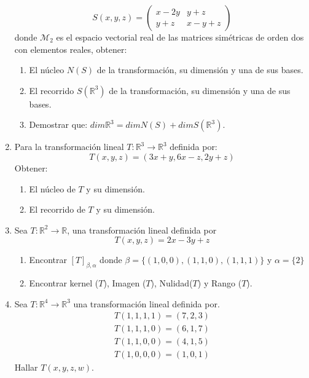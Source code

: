 \documentclass[12pt,letterpaper]{article}
\begin{document}
\begin{enumerate}
  $$
  S(x,y,z) = \begin{pmatrix}
    x-2y & y+z\\
    y+z & x-y+z
  \end{pmatrix}
  $$
  donde $\mathcal{M}_2$ es el espacio vectorial real de las matrices simétricas de orden dos con elementos reales, obtener:
  \begin{enumerate}
    \item El núcleo $N(S)$ de la transformación, su dimensión y una de sus bases.
    \item El recorrido $S(\mathbb{R}^3)$ de la transformación, su dimensión y una de sus bases.
    \item Demostrar que: $dim\mathbb{R}^3 = dim N(S) + dim S(\mathbb{R}^3)$.
  \end{enumerate}
  \item Para la transformación lineal $T : \mathbb{R}^3\to\mathbb{R}^3$ definida por:
  $$
  T (x, y, z) = (3x + y,6x- z,2y + z)
  $$
  Obtener:
  \begin{enumerate}
    \item El núcleo de $T$ y su dimensión.
    \item El recorrido de $T$ y su dimensión.
  \end{enumerate}
  \item Sea $T: \mathbb{R}^2\to\mathbb{R}$, una transformación lineal definida por
  $$
  T (x,y,z) = 2x -3y + z
  $$
  \begin{enumerate}
    \item Encontrar $[T]_{\beta,\alpha}$ donde $\beta = \{(1,0,0),(1,1,0),(1,1,1)\}$ y $\alpha =\{2\}$
    \item  Encontrar kernel ($T$), Imagen ($T$), Nulidad($T$) y Rango ($T$).
  \end{enumerate}
  \item Sea $T: \mathbb{R}^4\to\mathbb{R}^3$ una transformación lineal definida por.
  \begin{align*}
    T(1,1,1,1) = (7,2,3)\\
    T(1,1,1,0) =(6,1,7)\\
    T(1,1,0,0) = (4,1,5)\\
    T(1,0,0,0) = (1,0,1)
  \end{align*}
  Hallar $T( x,y,z,w)$.
\end{enumerate}
\end{document}
